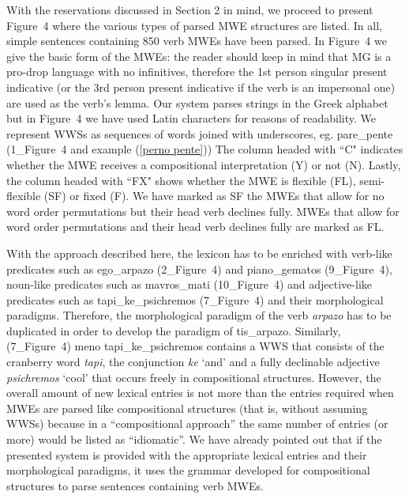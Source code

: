 \documentclass[output=paper,
modfonts
]{langscibook}
\begin{document}
With the reservations discussed in Section 2 in mind, we proceed to present Figure~4 where the various types of parsed MWE structures are listed. In all, simple sentences containing 850 verb MWEs have been parsed. In Figure~4 we give the basic form of the MWEs: the reader should keep in mind that MG is a pro-drop language with no infinitives, therefore the 1st person singular present indicative (or the 3rd person present indicative if the verb is an impersonal one) are used as the verb’s lemma. Our system parses strings in the Greek alphabet but in Figure~4 we have used Latin characters for reasons of readability. We represent WWSs as sequences of words joined with underscores, eg. pare\_pente (1\_Figure~4 and example (\ref{perno pente})) The column headed with ``C" indicates whether the MWE receives a compositional interpretation (Y) or not (N). Lastly, the column headed with ``FX" shows whether the MWE is flexible (FL), semi-flexible (SF) or fixed (F). We have marked as SF the MWEs that allow for no word order permutations but their head verb declines fully. MWEs that allow for word order permutations and their head verb declines fully are marked as FL.

With the approach described here, the lexicon has to be enriched with verb-like predicates such as ego\_arpazo (2\_Figure~4) and piano\_gematos (9\_Figure~4), noun-like predicates such as mavros\_mati (10\_Figure~4) and adjective-like predicates such as tapi\_ke\_psichremos (7\_Figure~4) and their morphological para\-digms. Therefore, the morphological paradigm of the verb \textit{arpazo} has to be duplicated in order to develop the paradigm of tis\_arpazo. Similarly,  (7\_Figure~4) meno tapi\_ke\_psichremos contains a   WWS that consists of the cranberry word \textit{tapi}, the conjunction \textit{ke} `and' and a fully declinable adjective \textit{psichremos} `cool' that occurs freely in compositional structures. However, the overall amount of new lexical entries is not more than the entries required when MWEs are parsed like compositional structures (that is, without assuming WWSs) because in a ``compositional approach” the same number of entries (or more) would be listed as ``idiomatic”. We have already pointed out that if the presented system is provided with the appropriate lexical entries and their morphological paradigms, it uses the grammar developed for compositional structures to parse sentences containing verb MWEs. 
\end{document}
